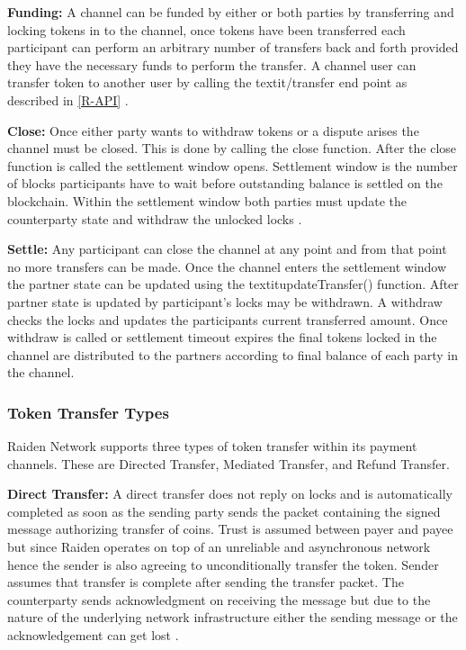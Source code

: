 \textbf{Funding:} A channel can be funded by either or both parties by transferring and locking tokens in to the channel, once tokens have been transferred each participant can perform an arbitrary number of transfers back and forth provided they have the necessary funds to perform the transfer. A channel user can transfer token to another user by calling the textit{/transfer} end point as described in \ref{R-API} \cite{rad:001}.

\textbf{Close:} Once either party wants to withdraw tokens or a dispute arises the channel must be closed. This is done by calling the close function. After the close function is called the settlement window opens. Settlement window is the number of blocks participants have to wait before outstanding balance is settled on the blockchain. Within the settlement window both parties must update the counterparty state and withdraw the unlocked locks \cite{rad:001}.

\textbf{Settle:} Any participant can close the channel at any point and from that point no more transfers can be made. Once the channel enters the settlement window the partner state can be updated using the textit{updateTransfer()} function. After partner state is updated by participant’s locks may be withdrawn. A withdraw checks the locks and updates the participants current transferred amount. Once withdraw is called or settlement timeout expires the final tokens locked in the channel are distributed to the partners according to final balance of each party in the channel\cite{rad:001}. 
\clearpage
\subsubsection{Token Transfer Types} \label{RaidenTrans}
Raiden Network supports three types of token transfer within its payment channels. These are Directed Transfer, Mediated Transfer, and Refund Transfer.

\textbf{Direct Transfer:} A direct transfer does not reply on locks and is automatically completed as soon as the sending party sends the packet containing the signed message authorizing transfer of coins. Trust is assumed between payer and payee but since Raiden operates on top of an unreliable and asynchronous network hence the sender is also agreeing to unconditionally transfer the token. Sender assumes that transfer is complete after sending the transfer packet. The counterparty sends acknowledgment on receiving the message but due to the nature of the underlying network infrastructure either the sending message or the acknowledgement can get lost \cite{rad:001}.

